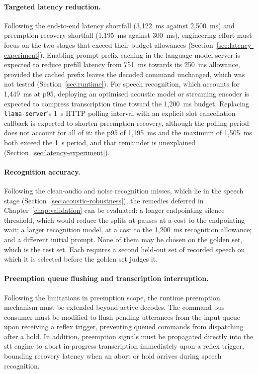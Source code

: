 \paragraph{Targeted latency reduction.} Following the
end-to-end latency shortfall (3{,}122~ms against 2{,}500~ms) and preemption recovery shortfall
(1{,}195~ms against 300~ms), engineering effort must focus on the two stages that exceed their budget
allowances (Section~\ref{sec:latency-experiment}). Enabling prompt prefix caching in the
language-model server is expected to reduce prefill latency from 751~ms towards its 250~ms allowance,
provided the cached prefix leaves the decoded command unchanged, which was not tested
(Section~\ref{sec:runtime}). For speech recognition, which accounts for 1{,}449~ms at p95, deploying an
optimised acoustic model or streaming encoder is expected to compress transcription time toward the
1{,}200~ms budget. Replacing \texttt{llama-server}'s 1~s HTTP polling interval with an explicit slot
cancellation callback is expected to shorten preemption recovery, although the polling period does not
account for all of it: the p95 of 1{,}195~ms and the maximum of 1{,}505~ms both exceed the 1~s period,
and that remainder is unexplained (Section~\ref{sec:latency-experiment}).

\paragraph{Recognition accuracy.} Following the clean-audio and noise recognition misses, which lie in
the speech stage (Section~\ref{sec:acoustic-robustness}), the remedies deferred in
Chapter~\ref{chap:validation} can be evaluated: a longer endpointing silence threshold, which would
reduce the splits at pauses at a cost to the endpointing wait; a larger recognition model, at a cost to
the 1{,}200~ms recognition allowance; and a different initial prompt. None of them may be chosen on the
golden set, which is the test set. Each requires a second held-out set of recorded speech on which it is
selected before the golden set judges it.

\paragraph{Preemption queue flushing and transcription interruption.} Following the limitations in
preemption scope, the runtime preemption mechanism must be extended beyond active decodes. The command
bus consumer must be modified to flush pending utterances from the input queue upon receiving a reflex
trigger, preventing queued commands from dispatching after a hold. In addition, preemption signals must
be propagated directly into the \gls{stt} engine to abort in-progress transcription immediately upon
a reflex trigger, bounding recovery latency when an abort or hold arrives during speech recognition.

